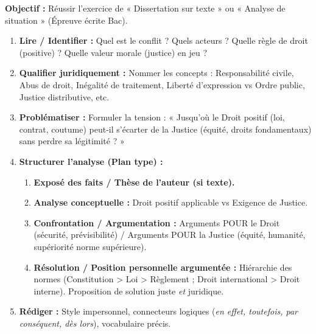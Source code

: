 \documentclass[11pt]{article}
\newcommand{\cle}[1]{{\popxbold\color{popdark}#1}}
\begin{document}
\begin{methode}
    \textbf{Objectif :} Réussir l'exercice de « Dissertation sur texte » ou « Analyse de situation » (Épreuve écrite Bac).
    \begin{enumerate}
        \item \textbf{Lire / Identifier :} Quel est le \cle{conflit} ? Quels acteurs ? Quelle règle de droit (positive) ? Quelle valeur morale (justice) en jeu ?
        \item \textbf{Qualifier juridiquement :} Nommer les concepts : \cle{Responsabilité civile}, \cle{Abus de droit}, \cle{Inégalité de traitement}, \cle{Liberté d'expression vs Ordre public}, \cle{Justice distributive}, etc.
        \item \textbf{Problématiser :} Formuler la tension : « Jusqu'où le Droit positif (loi, contrat, coutume) peut-il s'écarter de la Justice (équité, droits fondamentaux) sans perdre sa légitimité ? »
        \item \textbf{Structurer l'analyse (Plan type) :}
            \begin{enumerate}
                \item \textbf{Exposé des faits / Thèse de l'auteur (si texte).}
                \item \textbf{Analyse conceptuelle :} Droit positif applicable vs Exigence de Justice.
                \item \textbf{Confrontation / Argumentation :} Arguments POUR le Droit (sécurité, prévisibilité) / Arguments POUR la Justice (équité, humanité, supériorité norme supérieure).
                \item \textbf{Résolution / Position personnelle argumentée :} Hiérarchie des normes (Constitution > Loi > Règlement ; Droit international > Droit interne). Proposition de solution juste \emph{et} juridique.
            \end{enumerate}
        \item \textbf{Rédiger :} Style impersonnel, connecteurs logiques (\textit{en effet, toutefois, par conséquent, dès lors}), vocabulaire précis.
    \end{enumerate}
\end{methode}
\end{document}
